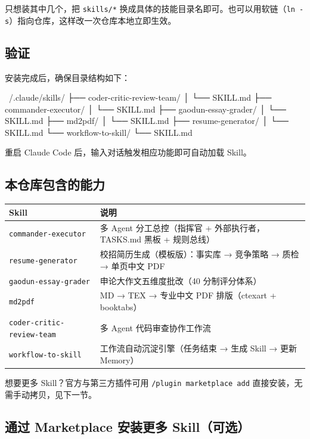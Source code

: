 \documentclass[12pt,a4paper]{ctexart}
\begin{document}
只想装其中几个，把 \texttt{skills/*} 换成具体的技能目录名即可。也可以用软链（\texttt{ln -s}）指向仓库，这样改一次仓库本地立即生效。

\subsection{验证}

安装完成后，确保目录结构如下：

\begin{shcode}
~/.claude/skills/
├── coder-critic-review-team/
│   └── SKILL.md
├── commander-executor/
│   └── SKILL.md
├── gaodun-essay-grader/
│   └── SKILL.md
├── md2pdf/
│   └── SKILL.md
├── resume-generator/
│   └── SKILL.md
└── workflow-to-skill/
    └── SKILL.md
\end{shcode}

重启 Claude Code 后，输入对话触发相应功能即可自动加载 Skill。

\subsection{本仓库包含的能力}

{
\centering
\small
\begin{tabular}{>{\RaggedRight\arraybackslash}p{5.2cm}>{\RaggedRight\arraybackslash}p{9.3cm}}
\toprule
\textbf{Skill} & \textbf{说明} \\
\midrule
\texttt{commander-executor} & 多 Agent 分工总控（指挥官 + 外部执行者，TASKS.md 黑板 + 规则总线） \\
\midrule
\texttt{resume-generator} & 校招简历生成（模板版）：事实库 → 竞争策略 → 质检 → 单页中文 PDF \\
\midrule
\texttt{gaodun-essay-grader} & 申论大作文五维度批改（40 分制评分体系） \\
\midrule
\texttt{md2pdf} & MD → TEX → 专业中文 PDF 排版（ctexart + booktabs） \\
\midrule
\texttt{coder-critic-review-team} & 多 Agent 代码审查协作工作流 \\
\midrule
\texttt{workflow-to-skill} & 工作流自动沉淀引擎（任务结束 → 生成 Skill → 更新 Memory） \\
\bottomrule
\end{tabular}
\par}

想要更多 Skill？官方与第三方插件可用 \texttt{/plugin marketplace add} 直接安装，无需手动拷贝，见下一节。

\subsection{通过 Marketplace 安装更多 Skill（可选）}
\end{document}
